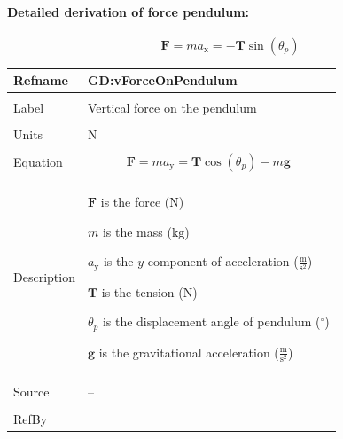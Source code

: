 \documentclass[12pt]{article}
\begin{document}
\paragraph{Detailed derivation of force pendulum:}
\label{GD:hForceOnPendulumDeriv}
\begin{displaymath}
\mathbf{F}=m {a_{\text{x}}}=-\mathbf{T} \sin\left({θ_{p}}\right)
\end{displaymath}
\vspace{\baselineskip}
\noindent
\begin{minipage}{\textwidth}
\begin{tabular}{>{\raggedright}p{}>{\raggedright\arraybackslash}p{}}
\toprule \textbf{Refname} & \textbf{GD:vForceOnPendulum}
\label{GD:vForceOnPendulum}
\\ \midrule \\
Label & Vertical force on the pendulum
        
\\ \midrule \\
Units & ${\text{N}}$
        
\\ \midrule \\
Equation & \begin{displaymath}
           \mathbf{F}=m {a_{\text{y}}}=\mathbf{T} \cos\left({θ_{p}}\right)-m \mathbf{g}
           \end{displaymath}
\\ \midrule \\
Description & \begin{symbDescription}
              \item{$\mathbf{F}$ is the force (${\text{N}}$)}
              \item{$m$ is the mass (${\text{kg}}$)}
              \item{${a_{\text{y}}}$ is the $y$-component of acceleration ($\frac{\text{m}}{\text{s}^{2}}$)}
              \item{$\mathbf{T}$ is the tension (${\text{N}}$)}
              \item{${θ_{p}}$ is the displacement angle of pendulum (${{}^{\circ}}$)}
              \item{$\mathbf{g}$ is the gravitational acceleration ($\frac{\text{m}}{\text{s}^{2}}$)}
              \end{symbDescription}
\\ \midrule \\
Source & --
         
\\ \midrule \\
RefBy & 
\\ \bottomrule
\end{tabular}
\end{minipage}
\end{document}
